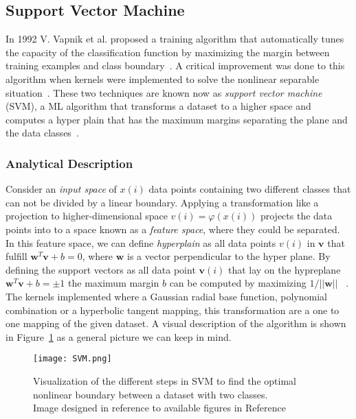 \subsection{Support Vector Machine}




In 1992 V. Vapnik et al. proposed a training algorithm that automatically tunes the capacity of the classification function by maximizing the margin between training examples and class boundary~\cite{boser1992training}. A critical improvement was done to this algorithm when kernels were implemented to solve the nonlinear separable situation~\cite{smola1998learning}. These two techniques are known now as \textit{support vector machine} (SVM), a ML algorithm that transforms a dataset to a higher space and computes a hyper plain that has the maximum margins separating the plane and the data classes~\cite{marsland2014machine}.~\\

\subsubsection{Analytical Description}

 Consider an \textit{input space} of $x(i)$ data points containing two different classes that can not be divided by a linear boundary. Applying a transformation like a projection to higher-dimensional space $v(i)=\varphi(x(i))$ projects the data points into to a space known as a \textit{feature space}, where they could be separated. In this feature space, we can define \textit{hyperplain} as all data points $v(i)$ in $\textbf{v}$ that fulfill $\textbf{w}^{T}\textbf{v}+b=0$, where $\textbf{w}$ is a vector perpendicular to the hyper plane. By defining the support vectors  as all data point $\textbf{v}(i)$ that lay on the hypreplane  $\textbf{w}^{T}\textbf{v}+b=\pm 1$ the maximum margin $b$ can be computed by maximizing $1/||\textbf{w}||$ ~\cite{marsland2014machine,Nonparameter,khan2019optical}. The kernels implemented where a Gaussian radial base function, polynomial combination or a hyperbolic tangent mapping, this transformation are a one to one mapping of the given dataset. A visual description of the algorithm is shown in Figure~\ref{fig:SVMshow} as a general picture we can keep in mind.~\\  
\begin{figure}[h]
\centering
\texttt{[image: SVM.png]}
\caption{Visualization of the different steps in SVM to find the optimal nonlinear boundary between a dataset with two classes.\\ {\scriptsize Image designed in reference to available figures in Reference~\cite{khan2019optical}}}
\label{fig:SVMshow}
\end{figure}


